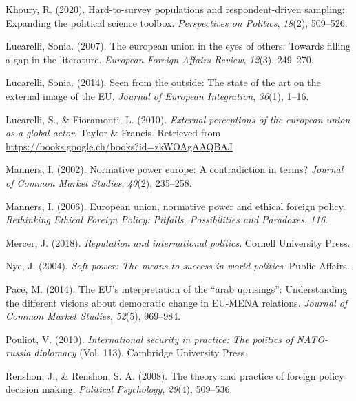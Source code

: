 \documentclass[
  letterpaper,
  DIV=11,
  numbers=noendperiod]{scrartcl}
\newlength{\cslhangindent}
\newenvironment{CSLReferences}[2] %
 {\begin{list}{}{%
  \setlength{\itemindent}{0pt}
  \setlength{\leftmargin}{0pt}
  \setlength{\parsep}{0pt}
  \ifodd #1
   \setlength{\leftmargin}{\cslhangindent}
   \setlength{\itemindent}{-1\cslhangindent}
  \fi
  \setlength{\itemsep}{#2\baselineskip}}}
 {\end{list}}
\begin{document}
\begin{CSLReferences}{1}{0}
Khoury, R. (2020). Hard-to-survey populations and respondent-driven
sampling: Expanding the political science toolbox. \emph{Perspectives on
Politics}, \emph{18}(2), 509--526.

Lucarelli, Sonia. (2007). The european union in the eyes of others:
Towards filling a gap in the literature. \emph{European Foreign Affairs
Review}, \emph{12}(3), 249--270.

Lucarelli, Sonia. (2014). Seen from the outside: The state of the art on
the external image of the {EU}. \emph{Journal of European Integration},
\emph{36}(1), 1--16.

Lucarelli, S., \& Fioramonti, L. (2010). \emph{External perceptions of
the european union as a global actor}. Taylor \& Francis. Retrieved from
\url{https://books.google.ch/books?id=zkWOAgAAQBAJ}

Manners, I. (2002). Normative power europe: A contradiction in terms?
\emph{Journal of Common Market Studies}, \emph{40}(2), 235--258.

Manners, I. (2006). European union, normative power and ethical foreign
policy. \emph{Rethinking Ethical Foreign Policy: Pitfalls, Possibilities
and Paradoxes}, \emph{116}.

Mercer, J. (2018). \emph{Reputation and international politics}. Cornell
University Press.

Nye, J. (2004). \emph{Soft power: The means to success in world
politics}. Public Affairs.

Pace, M. (2014). The EU's interpretation of the {``arab uprisings''}:
Understanding the different visions about democratic change in EU-MENA
relations. \emph{Journal of Common Market Studies}, \emph{52}(5),
969--984.

Pouliot, V. (2010). \emph{International security in practice: The
politics of NATO-russia diplomacy} (Vol. 113). Cambridge University
Press.

Renshon, J., \& Renshon, S. A. (2008). The theory and practice of
foreign policy decision making. \emph{Political Psychology},
\emph{29}(4), 509--536.


\end{CSLReferences}
\end{document}
